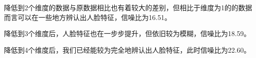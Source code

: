 \documentclass[12pt]{article}
\begin{document}
降低到2个维度的数据与原数据相比也有着较大的差别，但相比于维度为1的的数据而言可以在一些地方辨认出人脸特征，信噪比为16.51。
\begin{figure}[H]
    \centering
\end{figure}
降低到3个维度后，人脸特征也在一步步提升，但依旧较为模糊，信噪比为18.59。\par
\begin{figure}[H]
    \centering
\end{figure}
降低到4个维度后，我们已经能较为完全地辨认出人脸特征，此时信噪比为22.60。\par
\begin{figure}[H]
    \centering
\end{figure}
\end{document}
